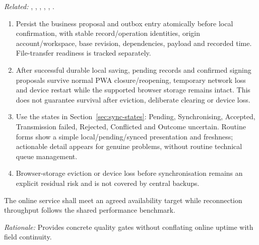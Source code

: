 \textit{Related:} \hyperref[fr:003]{}, \hyperref[fr:004]{}, \hyperref[fr:029]{}, \hyperref[fr:034]{}, \hyperref[fr:037]{}, \hyperref[fr:043]{}.
\begin{enumerate}[label=(\alph*),leftmargin=*,itemsep=1pt,topsep=3pt]
\item Persist the business proposal and outbox entry atomically before local confirmation, with stable record/operation identities, origin account/workspace, base revision, dependencies, payload and recorded time. File-transfer readiness is tracked separately.
\item After successful durable local saving, pending records and confirmed signing proposals survive normal PWA closure/reopening, temporary network loss and device restart while the supported browser storage remains intact. This does not guarantee survival after eviction, deliberate clearing or device loss.
\item Use the states in Section~\ref{sec:sync-states}: Pending, Synchronising, Accepted, Transmission failed, Rejected, Conflicted and Outcome uncertain. Routine forms show a simple local/pending/synced presentation and freshness; actionable detail appears for genuine problems, without routine technical queue management.
\item Browser-storage eviction or device loss before synchronisation remains an explicit residual risk and is not covered by central backups.
\end{enumerate}

\label{nfr:AOC-04}
The online service shall meet an agreed availability target while reconnection throughput follows the shared performance benchmark.

\textit{Rationale:} Provides concrete quality gates without conflating online uptime with field continuity.

